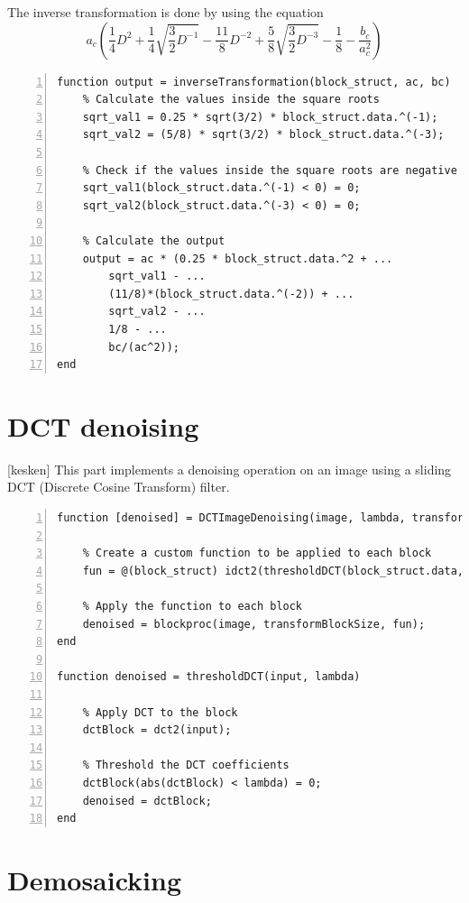 \documentclass[12pt,a4paper,english
]{tunithesis}
\begin{document}
The inverse transformation is done by using the equation
\[
a_c \left( \frac{1}{4} D^2 + \frac{1}{4}\sqrt{\frac{3}{2}D^{-1}} - \frac{11}{8}D^{-2} + \frac{5}{8}\sqrt{\frac{3}{2}D^{-3}} - \frac{1}{8} - \frac{b_c}{a_c^2} \right)
\]
\begin{lstlisting}[style=Matlab-editor, numbers=left, basicstyle=\small]
% % 9. Inverse transformation
function output = inverseTransformation(block_struct, ac, bc)
    % Calculate the values inside the square roots
    sqrt_val1 = 0.25 * sqrt(3/2) * block_struct.data.^(-1);
    sqrt_val2 = (5/8) * sqrt(3/2) * block_struct.data.^(-3);

    % Check if the values inside the square roots are negative
    sqrt_val1(block_struct.data.^(-1) < 0) = 0;
    sqrt_val2(block_struct.data.^(-3) < 0) = 0;

    % Calculate the output
    output = ac * (0.25 * block_struct.data.^2 + ...
        sqrt_val1 - ...
        (11/8)*(block_struct.data.^(-2)) + ...
        sqrt_val2 - ...
        1/8 - ...
        bc/(ac^2));
end
\end{lstlisting}

\section{DCT denoising}
[kesken]
This part implements a denoising operation on an image using a sliding DCT (Discrete Cosine Transform) filter.

\begin{lstlisting}[style=Matlab-editor, numbers=left, basicstyle=\small]
function [denoised] = DCTImageDenoising(image, lambda, transformBlockSize)

    % Create a custom function to be applied to each block
    fun = @(block_struct) idct2(thresholdDCT(block_struct.data, lambda));

    % Apply the function to each block
    denoised = blockproc(image, transformBlockSize, fun);
end

function denoised = thresholdDCT(input, lambda)

    % Apply DCT to the block
    dctBlock = dct2(input);

    % Threshold the DCT coefficients
    dctBlock(abs(dctBlock) < lambda) = 0;
    denoised = dctBlock;
end
\end{lstlisting}

\section{Demosaicking}
\end{document}

